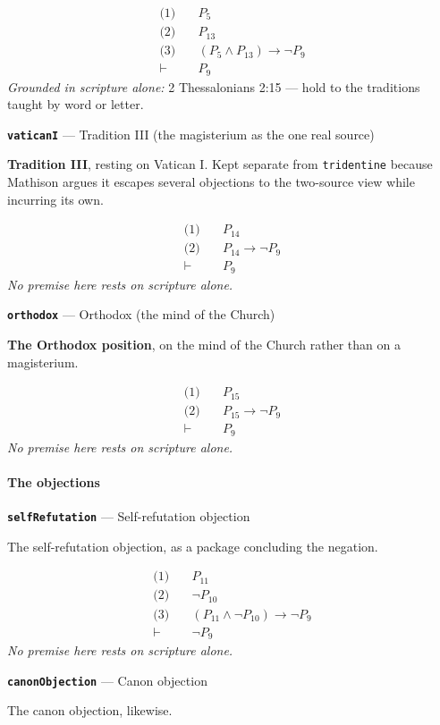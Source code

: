 \documentclass[11pt]{article}
\begin{document}
\begin{align*}
  \text{(1)} \quad & P_{5} \\
  \text{(2)} \quad & P_{13} \\
  \text{(3)} \quad & (P_{5} \land P_{13}) \rightarrow \lnot P_{9} \\
  \vdash \quad & P_{9}
\end{align*}
\emph{Grounded in scripture alone:} 2 Thessalonians 2:15 — hold to the traditions taught by word or letter.
\par\medskip\noindent\textbf{\texttt{vatican\allowbreak{}I}} --- Tradition III (the magisterium as the one real source)\par\nobreak\noindent
\textbf{Tradition III}, resting on Vatican I. Kept separate from \texttt{tridentine} because Mathison argues it escapes several objections to the two-source view while incurring its own.

\begin{align*}
  \text{(1)} \quad & P_{14} \\
  \text{(2)} \quad & P_{14} \rightarrow \lnot P_{9} \\
  \vdash \quad & P_{9}
\end{align*}
\emph{No premise here rests on scripture alone.}
\par\medskip\noindent\textbf{\texttt{orthodox}} --- Orthodox (the mind of the Church)\par\nobreak\noindent
\textbf{The Orthodox position}, on the mind of the Church rather than on a magisterium.

\begin{align*}
  \text{(1)} \quad & P_{15} \\
  \text{(2)} \quad & P_{15} \rightarrow \lnot P_{9} \\
  \vdash \quad & P_{9}
\end{align*}
\emph{No premise here rests on scripture alone.}
\paragraph*{The objections}
\leavevmode\par
\par\medskip\noindent\textbf{\texttt{self\allowbreak{}Refutation}} --- Self-refutation objection\par\nobreak\noindent
The self-refutation objection, as a package concluding the negation.

\begin{align*}
  \text{(1)} \quad & P_{11} \\
  \text{(2)} \quad & \lnot P_{10} \\
  \text{(3)} \quad & (P_{11} \land \lnot P_{10}) \rightarrow \lnot P_{9} \\
  \vdash \quad & \lnot P_{9}
\end{align*}
\emph{No premise here rests on scripture alone.}
\par\medskip\noindent\textbf{\texttt{canon\allowbreak{}Objection}} --- Canon objection\par\nobreak\noindent
The canon objection, likewise.
\end{document}
